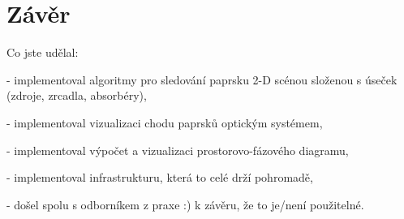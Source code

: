 \chapter{Závěr}


Co jste udělal:

- implementoval algoritmy pro sledování paprsku 2-D scénou složenou s
úseček (zdroje, zrcadla, absorbéry),

- implementoval vizualizaci chodu paprsků optickým systémem,

- implementoval výpočet a vizualizaci prostorovo-fázového diagramu,

- implementoval infrastrukturu, která to celé drží pohromadě,

- došel spolu s odborníkem z praxe :) k závěru, že to je/není použitelné.
